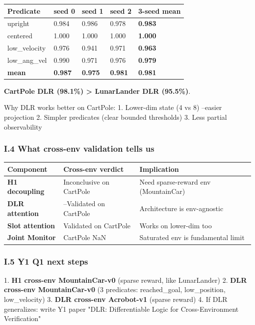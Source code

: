 \documentclass[11pt]{article}
\begin{document}
\begin{tabular}{lllll}
Predicate & seed 0 & seed 1 & seed 2 & 3-seed mean \\
\hline
upright & 0.984 & 0.986 & 0.978 & \textbf{0.983} \\
centered & 1.000 & 1.000 & 1.000 & \textbf{1.000} \\
low\_velocity & 0.976 & 0.941 & 0.971 & \textbf{0.963} \\
low\_ang\_vel & 0.990 & 0.971 & 0.976 & \textbf{0.979} \\
\textbf{mean} & \textbf{0.987} & \textbf{0.975} & \textbf{0.981} & \textbf{0.981} \\
\end{tabular}


\textbf{CartPole DLR (98.1\%) > LunarLander DLR (95.5\%)}.

Why DLR works better on CartPole:
1. Lower-dim state (4 vs 8) --easier projection
2. Simpler predicates (clear bounded thresholds)
3. Less partial observability

\subsubsection{I.4 What cross-env validation tells us}

\begin{tabular}{lll}
Component & Cross-env verdict & Implication \\
\hline
\textbf{H1 decoupling} & Inconclusive on CartPole & Need sparse-reward env (MountainCar) \\
\textbf{DLR attention} & --Validated on CartPole & Architecture is env-agnostic \\
\textbf{Slot attention} & Validated on CartPole & Works on lower-dim too \\
\textbf{Joint Monitor} & CartPole NaN & Saturated env is fundamental limit \\
\end{tabular}


\subsubsection{I.5 Y1 Q1 next steps}

1. \textbf{H1 cross-env MountainCar-v0} (sparse reward, like LunarLander)
2. \textbf{DLR cross-env MountainCar-v0} (3 predicates: reached\_goal, low\_position, low\_velocity)
3. \textbf{DLR cross-env Acrobot-v1} (sparse reward)
4. If DLR generalizes: write Y1 paper "DLR: Differentiable Logic for
   Cross-Environment Verification"
\end{document}
